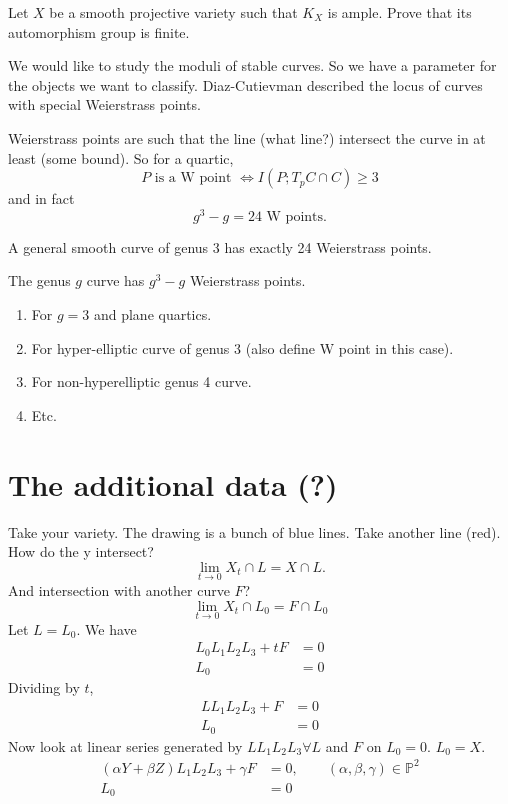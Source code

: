 \begin{exercise}
	Let $X$ be a smooth projective variety such that $K_X$ is ample. Prove that its automorphism group is finite.
\end{exercise}



We would like to study the moduli of stable curves. So we have a parameter for the objects we want to classify. Diaz-Cutievman described the locus of curves with special  Weierstrass points.

Weierstrass points are such that the line (what line?) intersect the curve in at least (some bound). So for a quartic,
\[P\text{ is a W point }\iff I(P;T_pC\cap C)\geq 3 \]
and in fact
\[g^3-g=24\text{ W points.}\]

\begin{remark}
	A general smooth curve of genus 3 has exactly 24 Weierstrass points.
\end{remark}

\begin{exercise}\leavevmode 
	The genus $g$ curve has $g^3-g$ Weierstrass points.
\begin{enumerate}[label=\alph*.]
	\item For $g=3$ and plane quartics.
	 \item For hyper-elliptic curve of genus $3$ (also define W point in this case).
\item For non-hyperelliptic genus 4 curve.
\item Etc.
\end{enumerate}
\end{exercise}

\section{The additional data (?)}

Take your variety. The drawing is a bunch of blue lines. Take another line (red). How do the y intersect?
\[\lim_{t\to 0}X_t\cap L=X\cap L.\]
And intersection with another curve $F$?
\[\lim_{t \to 0} X_t\cap L_0=F\cap L_0\]
Let $L=L_0$. We have
\begin{align*}
	L_0L_1L_2L_3+tF&=0\\
	L_0&=0
\end{align*}
Dividing by $t$,
\begin{align*}
	LL_1L_2L_3+F&=0\\
	L_0&=0
\end{align*}
Now look at linear series generated by $LL_1L_2L_3\forall L$ and $F$ on $L_0=0$. $L_0=X$.
\begin{align*}
	(\alpha Y+\beta Z)L_1L_2L_3+\gamma F&=0,\qquad (\alpha,\beta,\gamma )\in\mathbb{P}^2\\
	L_0&=0
\end{align*}

